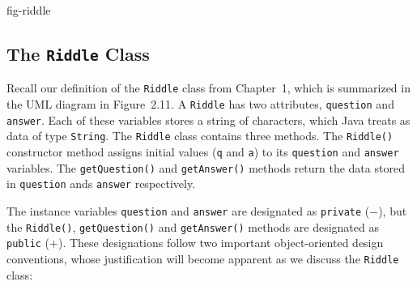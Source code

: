 {fig-riddle}
\subsection{The {\tt Riddle} Class}

\noindent Recall our definition of the {\tt Riddle} class from
Chapter~1, which is summarized in the UML diagram in Figure~2.11. A
{\tt Riddle} has two attributes, {\tt question} and {\tt answer}. Each
of these variables stores a string of characters, which Java treats as
data of type {\tt String}.  The {\tt Riddle} class contains three
methods.  The {\tt Riddle()} constructor method assigns initial values
({\tt q} and {\tt a}) to its {\tt question} and {\tt answer}
variables.  The {\tt getQuestion()} and {\tt getAnswer()} methods
return the data stored in {\tt question} ands {\tt answer}
respectively.

The instance variables {\tt question} and {\tt answer} are designated
as {\tt private} ($-$), but the {\tt Riddle()}, {\tt getQuestion()}
and {\tt getAnswer()} methods are designated as {\tt public}
($+$). These designations follow two important object-oriented design
conventions, whose justification will become apparent as we
discuss the {\tt Riddle} class: 




